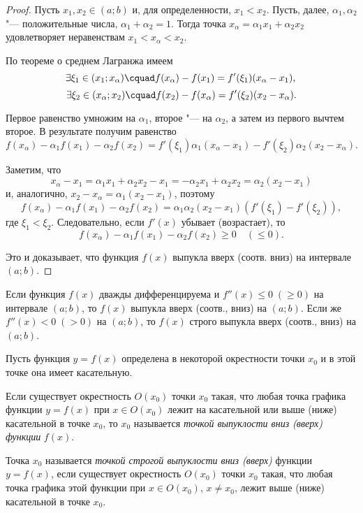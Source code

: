 \begin{proof}
Пусть $x_1,x_2\in(a;b)$ и, для определенности, $x_1<x_2$. Пусть, далее, $\alpha_1, \alpha_2$ "--- положительные числа, $\alpha_1+\alpha_2=1$. Тогда точка $x_\alpha=\alpha_1x_1+\alpha_2x_2$ удовлетворяет неравенствам $x_1<x_\alpha<x_2$.

По теореме о среднем Лагранжа имеем
$$
\exists \xi_1\in(x_1;x_\alpha)\cquad f(x_\alpha)-f(x_1)=f'(\xi_1)(x_\alpha-x_1),\\
$$
$$
\exists \xi_2\in(x_\alpha;x_2)\cquad f(x_2)-f(x_\alpha)=f'(\xi_2)(x_2-x_\alpha).
$$

Первое равенство умножим на $\alpha_1$, второе  "--- на $\alpha_2$, а затем из первого вычтем второе. В результате получим равенство
$$
f(x_\alpha)-\alpha_1f(x_1)-\alpha_2f(x_2)=f'(\xi_1)\alpha_1(x_\alpha-x_1)-f'(\xi_2)\alpha_2(x_2-x_\alpha).
$$

Заметим, что 
$$
x_\alpha-x_1=\alpha_1x_1+\alpha_2x_2-x_1=-\alpha_2x_1+\alpha_2x_2=\alpha_2(x_2-x_1)
$$
и, аналогично, $x_2-x_\alpha=\alpha_1(x_2-x_1)$, поэтому
$$
f(x_\alpha)-\alpha_1f(x_1)-\alpha_2f(x_2)=\alpha_1\alpha_2(x_2-x_1)(f'(\xi_1)-f'(\xi_2)),
$$
где $\xi_1<\xi_2$. Следовательно, если $f'(x)$ убывает (возрастает), то 
$$
f(x_\alpha)-\alpha_1f(x_1)-\alpha_2f(x_2)\ge 0 \quad(\le 0).
$$

Это и доказывает, что функция $f(x)$ выпукла вверх (соотв. вниз) на интервале $(a;b)$.
\end{proof}
\begin{cons}
Если функция $f(x)$ дважды дифференцируема и $f''(x)\le 0\;(\ge 0)$ на интервале $(a;b)$, то $f(x)$ выпукла вверх (соотв., вниз) на $(a;b)$. Если же $f''(x)<0\;(>0)$ на $(a;b)$, то $f(x)$ строго выпукла вверх (соотв., вниз) на $(a;b)$.
\end{cons}


Пусть функция $y=f(x)$ определена в некоторой окрестности точки $x_0$ и в этой точке она имеет касательную.

\begin{defn}
Если существует окрестность $O(x_0)$ точки $x_0$ такая, что любая точка графика функции $y=f(x)$ при $x\in O(x_0)$ лежит на касательной или выше (ниже) касательной в точке $x_0$, то $x_0$ называется \textit{точкой выпуклости вниз (вверх) функции} $f(x)$.
\end{defn}

\begin{defn}
Точка $x_0$ называется \textit{точкой строгой выпуклости вниз (вверх)} функции $y=f(x)$, если существует окрестность $O(x_0)$ точки $x_0$ такая, что любая точка графика этой функции при $x\in O(x_0)$, $x\neq x_0$, лежит выше (ниже) касательной в точке $x_0$.
\end{defn}


